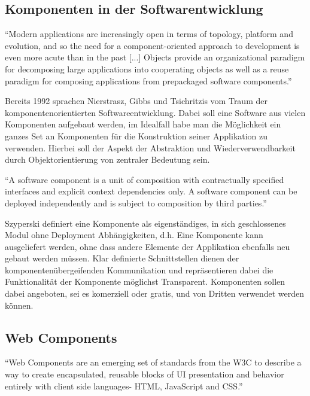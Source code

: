 \subsection{Komponenten in der Softwarentwicklung}

``Modern applications are increasingly
open in terms of topology,
platform and evolution, and so the
need for a component-oriented
approach to development is even
more acute than in the past [...]  Objects provide an organizational
paradigm for decomposing large
applications into cooperating objects
as well as a reuse paradigm for
composing applications from prepackaged
software components.''
\cite{nierstrasz1992component}

\vspace{0.5cm}

Bereits 1992 sprachen Nierstrasz, Gibbs und Tsichritzis vom Traum der komponentenorientierten Softwareentwicklung.
Dabei soll eine Software aus vielen Komponenten aufgebaut werden, im Idealfall habe man die Möglichkeit ein
ganzes Set an Komponenten für die Konstruktion seiner Applikation zu verwenden.
Hierbei soll der Aspekt der Abstraktion und Wiederverwendbarkeit durch Objektorientierung von zentraler Bedeutung sein.

\vspace{0.5cm}
``A software component is a unit of composition with contractually specified interfaces and explicit
context dependencies only. A software component can be deployed independently and is subject to composition
by third parties.''
\cite{Szyperski}
\vspace{0.5cm}

Szyperski definiert eine Komponente als eigenständiges, in sich geschlossenes Modul ohne Deployment
Abhängigkeiten, d.h. Eine Komponente kann ausgeliefert werden, ohne dass andere Elemente der Applikation ebenfalls neu gebaut werden müssen.
Klar definierte Schnittstellen dienen der komponentenübergeifenden Kommunikation und repräsentieren
dabei die Funktionalität der Komponente möglichst Transparent.
Komponenten sollen dabei angeboten, sei es komerziell oder gratis,
und von Dritten verwendet werden können.


\subsection{Web Components}

``Web Components are an emerging set of standards from the W3C to describe a way to create encapsulated,
reusable blocks of UI presentation and behavior entirely with client side languages- HTML, JavaScript and CSS.''
\cite[42]{Web-Component-Architecture}
\vspace{1cm}


